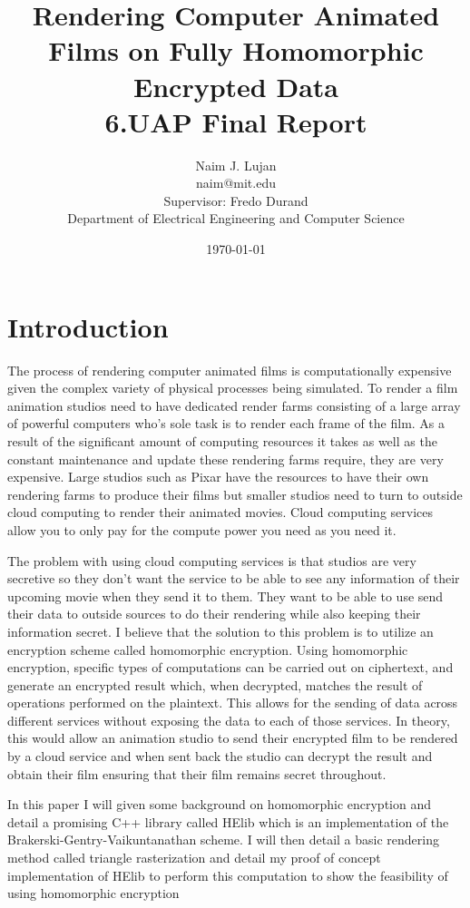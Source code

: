 \documentclass[12pt]{article}
\title{Rendering Computer Animated Films on 
Fully Homomorphic Encrypted Data\\
6.UAP Final Report
}
\author{
Naim J. Lujan\\
naim@mit.edu\\
Supervisor: Fredo Durand\\
Department of Electrical Engineering and Computer Science
}
\date{\today}
\begin{document}
\maketitle

\section{Introduction}

The process of rendering computer animated films is computationally expensive given the complex variety of physical processes being simulated. To render a film animation studios need to have dedicated render farms consisting of a large array of powerful computers who's sole task is to render each frame of the film. As a result of the significant amount of computing resources it takes as well as the constant maintenance and update these rendering farms require, they are very expensive. Large studios such as Pixar have the resources to have their own rendering farms to produce their films but smaller studios need to turn to outside cloud computing to render their animated movies. Cloud computing services allow you to only pay for the compute power you need as you need it.

The problem with using cloud computing services is that studios are very secretive so they don't want the service to be able to see any information of their upcoming movie when they send it to them. They want to be able to use send their data to outside sources to do their rendering while also keeping their information secret. I believe that the solution to this problem is to utilize an encryption scheme called homomorphic encryption. Using homomorphic encryption, specific types of computations can be carried out on ciphertext, and generate an encrypted result which, when decrypted, matches the result of operations performed on the plaintext. This allows for the sending of data across different services without exposing the data to each of those services. In theory, this would allow an animation studio to send their encrypted film to be rendered by a cloud service and when sent back the studio can decrypt the result and obtain their film ensuring that their film remains secret throughout. 

In this paper I will given some background on homomorphic encryption and detail a promising C++ library called HElib which is an implementation of the Brakerski-Gentry-Vaikuntanathan scheme. I will then detail a basic rendering method called triangle rasterization and detail my proof of concept implementation of HElib to perform this computation to show the feasibility of using homomorphic encryption 
\end{document}
